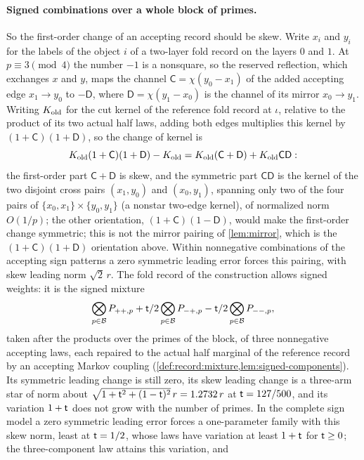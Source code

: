 \paragraph{Signed combinations over a whole block of primes.}
So the first-order change of an accepting record should be skew. Write $x_i$
and $y_i$ for the labels of the object $i$ of a two-layer fold record on the
layers $0$ and $1$. At $p\equiv3\pmod4$ the number $-1$ is a nonsquare, so the
reserved reflection, which exchanges $x$ and $y$, maps the channel
$\mathsf C=\chi(y_0-x_1)$ of the added accepting edge $x_1\to y_0$ to
$-\mathsf D$, where $\mathsf D=\chi(y_1-x_0)$ is the channel of its mirror
$x_0\to y_1$. Writing $K_{\rm old}$ for the cut kernel of the reference fold
record at $\iota$, relative to the product of its two actual half
laws, adding both edges multiplies this kernel by
$(1+\mathsf C)(1+\mathsf D)$, so the change of kernel is
\[
 K_{\rm old}(1+\mathsf C)(1+\mathsf D)-K_{\rm old}
 =K_{\rm old}(\mathsf C+\mathsf D)+K_{\rm old}\mathsf C\mathsf D:
\]
the first-order part $\mathsf C+\mathsf D$ is skew, and the symmetric part
$\mathsf C\mathsf D$ is the kernel of the two disjoint cross
pairs $(x_1,y_0)$ and $(x_0,y_1)$, spanning only two of the four
pairs of $\{x_0,x_1\}\times\{y_0,y_1\}$ (a nonstar two-edge
kernel), of normalized norm $O(1/p)$; the other orientation, $(1+\mathsf C)(1-\mathsf D)$, would make the
first-order change symmetric; this is not the mirror pairing of
\cref{lem:mirror}, which is the $(1+\mathsf C)(1+\mathsf D)$
orientation above. Within nonnegative
combinations of the accepting sign patterns a zero symmetric leading error
forces this pairing, with skew leading norm $\sqrt2\,r$. The fold record of the
construction allows signed weights: it is the signed mixture
\[
 \bigotimes_{p\in\mathcal B}P_{++,p}+\mathsf t/2\bigotimes_{p\in\mathcal B}P_{-+,p}
 -\mathsf t/2\bigotimes_{p\in\mathcal B}P_{--,p},
\]
taken after the products over the primes of the block, of three nonnegative
accepting laws, each repaired to the actual half marginal of the reference
record by an accepting Markov coupling
(\cref{def:record:mixture,lem:signed-components}). Its symmetric leading
change is still zero, its skew leading change is a three-arm star of norm
about $\sqrt{1+\mathsf t^2+(1-\mathsf t)^2}\,r=1.2732\,r$ at $\mathsf t=127/500$, and its
variation $1+\mathsf t$ does not grow with the number of primes. In the complete
sign model a zero symmetric leading error forces a one-parameter family with
this skew norm, least at $\mathsf t=1/2$, whose laws have variation at least
$1+\mathsf t$ for $\mathsf t\ge0$; the three-component law attains this variation, and
